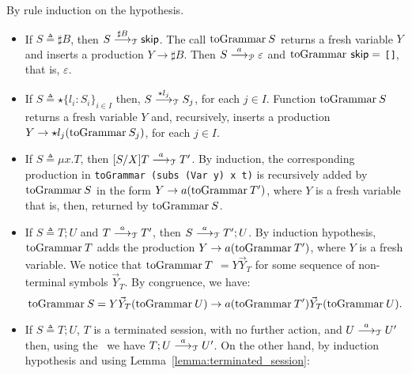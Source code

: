 \begin{itemizeproof}
By rule induction on the hypothesis.
\begin{itemize}
\item If $S\triangleq \sharp B$, then
  $S \LTSderives[\sharp B] \skipk$. The call $\toGrammarf S$
  returns a fresh variable $Y$ and inserts a production
  $Y\rightarrow \sharp B$. Then $S \LTSderivesP \varepsilon$ and
  $\toGrammarf\,\skipk =$ \lstinline{[]}, that is, $\varepsilon$.
\item If $S\triangleq \star\{l_i\colon S_i\}_{i\in I}$ then,
  $S \LTSderives[\star l_j] S_j$, for each $j\in I$. Function
  $\toGrammarf S$ returns a fresh variable $Y$ and, recursively,
  inserts a production $Y\rightarrow \star l_j (\toGrammarf{S_j})$,
  for each $j\in I$.
\item If $S\triangleq \mu x.T$, then $\subs SXT \LTSderives T'$.
  By induction, the corresponding production in
  \lstinline{toGrammar (subs (Var y) x t)} is recursively added by
  $\toGrammarf S$ in the form $Y \rightarrow a (\toGrammarf{T'})$,
  where $Y$ is a fresh variable that is, then, returned by
  $\toGrammarf S$.
\item If $S\triangleq T;U$ and $T \LTSderives[a] T'$, then
  $S \LTSderives[a] T';U$.  By induction hypothesis, $\toGrammarf T$
  adds the production $Y\rightarrow a (\toGrammarf{T'})$, where $Y$
  is a fresh variable.  We notice that $\toGrammarf T$
  $= Y \vec Y_T$ for some sequence of non-terminal symbols
  $\vec Y_T$. By congruence, we have:
  \[\toGrammarf S = Y\vec Y_T(\toGrammarf U)
    \rightarrow a(\toGrammarf T')\vec Y_T(\toGrammarf U)
    .\]
\item If $S\triangleq T;U$, $T$ is a terminated session, with no further
  action, and $U \LTSderives[a] U'$ then, using the \LTS\ we have
  $T;U \LTSderives[a] U'$. On the other hand, by induction hypothesis and
  using Lemma~\ref{lemma:terminated_session}:

\end{itemize}
\end{itemizeproof}
